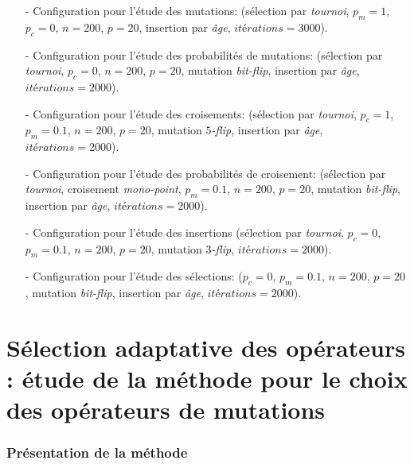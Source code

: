 \documentclass[twocolumn]{article}
\begin{document}
\begin{itemize}
    \item[-] Configuration pour l'étude des mutations:
    (sélection par \emph{tournoi}, $p_{m}=1$, $p_{c}=0$, $n=200$, $p=20$, insertion par \emph{âge}, $itérations=3000$).
    
    \item[-] Configuration pour l'étude des probabilités de mutations:
    (sélection par \emph{tournoi}, $p_{c}=0$, $n=200$, $p=20$, mutation \emph{bit-flip}, insertion par \emph{âge}, $itérations=2000$).
    
    
    \item[-] Configuration pour l'étude des croisements:
    (sélection par \emph{tournoi}, $p_{c}=1$, $p_{m}=0.1$, $n=200$, $p=20$, mutation \emph{$5$-flip}, insertion par \emph{âge}, $itérations=2000$).
    
    \item[-] Configuration pour l'étude des probabilités de croisement:
    (sélection par \emph{tournoi}, croisement \emph{mono-point}, $p_{m}=0.1$, $n=200$, $p=20$, mutation \emph{bit-flip}, insertion par \emph{âge}, $itérations=2000$).
        
    \item[-] Configuration pour l'étude des insertions
    (sélection par \emph{tournoi}, $p_{c}=0$, $p_{m}=0.1$, $n=200$, $p=20$, mutation \emph{$3$-flip}, $itérations=2000$).

    \item[-] Configuration pour l'étude des sélections:
    ($p_{c}=0$, $p_{m}=0.1$, $n=200$, $p=20$, mutation \emph{bit-flip}, insertion par \emph{âge}, $itérations=2000$).

\end{itemize}

\section{Sélection adaptative des opérateurs : étude de la méthode pour le choix des opérateurs de mutations}

\subsubsection{Présentation de la méthode}
\end{document}
